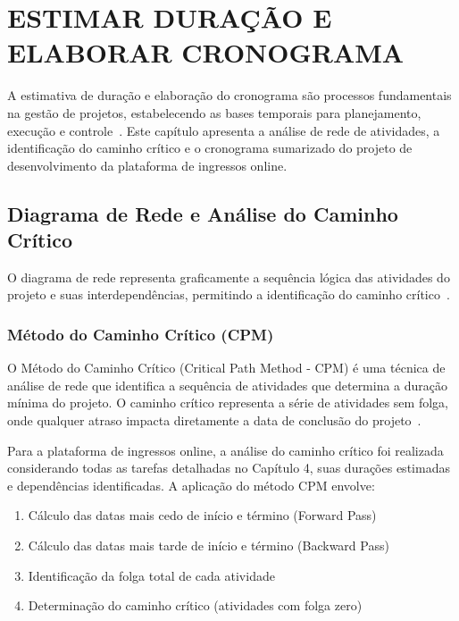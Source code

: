 \chapter{ESTIMAR DURAÇÃO E ELABORAR CRONOGRAMA}

A estimativa de duração e elaboração do cronograma são processos fundamentais na gestão de projetos, estabelecendo as bases temporais para planejamento, execução e controle~\cite{PMI:2021}. Este capítulo apresenta a análise de rede de atividades, a identificação do caminho crítico e o cronograma sumarizado do projeto de desenvolvimento da plataforma de ingressos online.

\section{Diagrama de Rede e Análise do Caminho Crítico}

O diagrama de rede representa graficamente a sequência lógica das atividades do projeto e suas interdependências, permitindo a identificação do caminho crítico~\cite{Kerzner:2022}.

\subsection{Método do Caminho Crítico (CPM)}

O Método do Caminho Crítico (Critical Path Method - CPM) é uma técnica de análise de rede que identifica a sequência de atividades que determina a duração mínima do projeto. O caminho crítico representa a série de atividades sem folga, onde qualquer atraso impacta diretamente a data de conclusão do projeto~\cite{PMI:2021}.

Para a plataforma de ingressos online, a análise do caminho crítico foi realizada considerando todas as tarefas detalhadas no Capítulo 4, suas durações estimadas e dependências identificadas. A aplicação do método CPM envolve:

\begin{enumerate}
    \item Cálculo das datas mais cedo de início e término (Forward Pass)
    \item Cálculo das datas mais tarde de início e término (Backward Pass)
    \item Identificação da folga total de cada atividade
    \item Determinação do caminho crítico (atividades com folga zero)
\end{enumerate}

